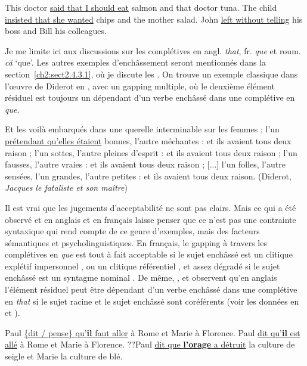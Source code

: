 \ea \label{ch2:ex125}
\ea  This doctor \uline{said that I should eat} salmon and that doctor tuna. \label{ch2:ex125a}
\ex  The child \uline{insisted that she wanted} chips and the mother salad. \label{ch2:ex125b}
\ex  *John \uline{left without telling} his boss and Bill his colleagues. \citep{Gardent1991} \label{ch2:ex125c}
\z
\z

Je me limite ici aux discussions sur les complétives en angl. \textit{that}, fr. \textit{que} et roum. \textit{că} ‘que’. Les autres exemples d’enchâssement seront mentionnés dans la section~\ref{ch2:sect2.4.3.1}, où je discute les . On trouve un exemple classique dans l’œuvre de Diderot en , avec un gapping multiple, où le deuxième élément résiduel est toujours un dépendant d’un verbe enchâssé dans une complétive en \textit{que}. 

\ea \label{ch2:ex126}
Et les voilà embarqués dans une querelle interminable sur les femmes ; l’un \uline{prétendant qu’elles étaient} bonnes, l’autre méchantes : et ils avaient tous deux raison ; l’un sottes, l’autre pleines d’esprit : et ils avaient tous deux raison ; l’un fausses, l’autre vraies : et ils avaient tous deux raison ; [...] l’un folles, l’autre sensées, l’un grandes, l’autre petites : et ils avaient tous deux raison. (Diderot, \textit{Jacques le fataliste et son maître})
\z

Il est vrai que les jugements d’acceptabilité ne sont pas clairs. Mais ce qui a été observé et en anglais et en français laisse penser que ce n’est pas une contrainte syntaxique qui rend compte de ce genre d’exemples, mais des facteurs sémantiques et psycholinguistiques. En français, le gapping à travers les complétives en \textit{que} est tout à fait acceptable si le sujet enchâssé est un clitique explétif impersonnel , ou un clitique référentiel , et assez dégradé si le sujet enchâssé est un syntagme nominal . De même, \citet[113]{Merchant2001}, \citet{Lasnik2006} et \citet{Repp2009} observent qu’en anglais l’élément résiduel peut être dépendant d’un verbe enchâssé dans une complétive en \textit{that} si le sujet racine et le sujet enchâssé sont coréférents (voir les données en  et ).

\ea
\ea Paul \uline{\{dit / pense\} qu’\textbf{il} faut aller} à Rome et Marie à Florence. \label{ch2:ex127a}
\ex Paul \uline{dit qu’\textbf{il} est allé} à Rome et Marie à Florence. \label{ch2:ex127b}
\ex ??Paul \uline{dit que \textbf{l’orage} a détruit} la culture de seigle et Marie la culture de blé.\label{ch2:ex127c}
\z
\z

